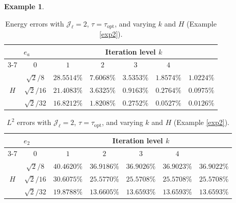 \documentclass{article}[11pt]
\theoremstyle{definition}
\newtheorem{exmp}{Example}[section]
\begin{document}
\begin{exmp}
\begin{table}[ht!]
\centering
\begin{tabular}{cc||ccccc}
\hline
\multicolumn{2}{c||}{\multirow{2}{*}{$e_a$}}   & \multicolumn{5}{c}{Iteration level $k$}           \\ \cline{3-7} 
\multicolumn{2}{c||}{} &   $0$ & $1$   & $2$   & $3$   & $4$   \\ 
\hline \hline
\multicolumn{1}{c|}{\multirow{3}{*}{$H$}} & $\sqrt{2}/8$ & $28.5514\%$ & $7.6068\%$ & $3.5353\%$ & $1.8574\%$ & $1.0224\%$ \\
\multicolumn{1}{c|}{} &  $\sqrt{2}/16$ & $21.4083\%$ & $3.6325\%$ & $0.9163\%$ & $0.2764\%$ & $0.0975\%$ \\
\multicolumn{1}{c|}{} &  $\sqrt{2}/32$ & $16.8212\%$ & $1.8208\%$ & $0.2752\%$ & $0.0527\%$ & $0.0126\%$ \\
\hline
\end{tabular}
\caption{Energy errors with $\mathcal{J}_{\ell} = 2$, $\tau = \tau_{\text{opt}}$, and varying $k$ and $H$ (Example 
\ref{exp2}).}
\label{tab:exp2-v}
\end{table}

\begin{table}[ht!]
\centering
\begin{tabular}{cc||ccccc}
\hline
\multicolumn{2}{c||}{\multirow{2}{*}{$e_2$}}   & \multicolumn{5}{c}{Iteration level $k$}           \\ \cline{3-7} 
\multicolumn{2}{c||}{} &   $0$ & $1$   & $2$   & $3$   & $4$   \\ 
\hline \hline
\multicolumn{1}{c|}{\multirow{3}{*}{$H$}} & 
$\sqrt{2}/8$ & $40.4620\%$ & $36.9186\%$ & $36.9026\%$ & $36.9023\%$ & $36.9022\%$ \\
\multicolumn{1}{c|}{} & 
$\sqrt{2}/16$ & $30.6075\%$ & $25.5770\%$ & $25.5708\%$ & $25.5708\%$ & $25.5708\%$ \\
\multicolumn{1}{c|}{} &  
$\sqrt{2}/32$ & $19.8788\%$ & $13.6605\%$ & $13.6593\%$ & $13.6593\%$ & $13.6593\%$ \\
\hline
\end{tabular}
\caption{$L^2$ errors with $\mathcal{J}_{\ell} = 2$, $\tau = \tau_{\text{opt}}$, and varying $k$ and $H$ (Example \ref{exp2}).}
\label{tab:exp2-p}
\end{table}
\end{exmp}
\end{document}

